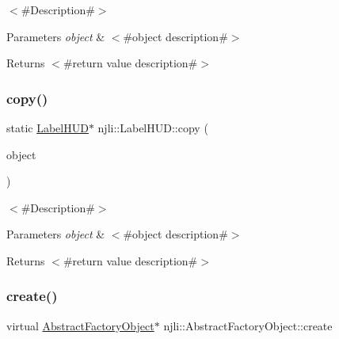 $<$\#\+Description\#$>$


\begin{DoxyParams}{Parameters}
{\em object} & $<$\#object description\#$>$\\
\hline
\end{DoxyParams}
\begin{DoxyReturn}{Returns}
$<$\#return value description\#$>$ 
\end{DoxyReturn}
\mbox{\label{classnjli_1_1_label_h_u_d_ad592872b1e59d73aa8d3dfcaec1daec9}} 
\subsubsection{\texorpdfstring{copy()}{copy()}}
{\footnotesize\ttfamily static \mbox{\hyperlink{classnjli_1_1_label_h_u_d}{Label\+H\+UD}}$\ast$ njli\+::\+Label\+H\+U\+D\+::copy (\begin{DoxyParamCaption}\item[{const \mbox{\hyperlink{classnjli_1_1_label_h_u_d}{Label\+H\+UD}} \&}]{object }\end{DoxyParamCaption})\hspace{0.3cm}{\ttfamily [static]}}

$<$\#\+Description\#$>$


\begin{DoxyParams}{Parameters}
{\em object} & $<$\#object description\#$>$\\
\hline
\end{DoxyParams}
\begin{DoxyReturn}{Returns}
$<$\#return value description\#$>$ 
\end{DoxyReturn}
\mbox{\label{classnjli_1_1_label_h_u_d_a83a8876ae63b92804004cf3febe76573}} 
\subsubsection{\texorpdfstring{create()}{create()}\hspace{0.1cm}{\footnotesize\ttfamily [1/3]}}
{\footnotesize\ttfamily virtual \mbox{\hyperlink{classnjli_1_1_abstract_factory_object}{Abstract\+Factory\+Object}}$\ast$ njli\+::\+Abstract\+Factory\+Object\+::create}

